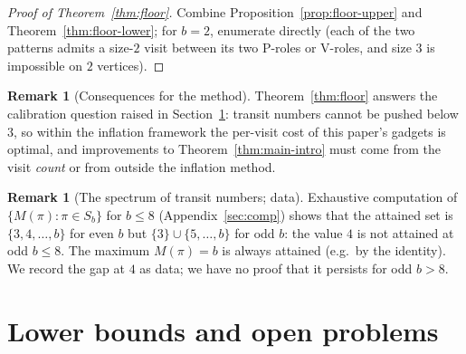 \documentclass[11pt]{article}
\theoremstyle{definition}
\newtheorem{remark}[theorem]{Remark}
\begin{document}
\begin{proof}[Proof of Theorem~\ref{thm:floor}]
Combine Proposition~\ref{prop:floor-upper} and Theorem~\ref{thm:floor-lower}; for
$b = 2$, enumerate directly (each of the two patterns admits a size-$2$ visit between
its two P-roles or V-roles, and size $3$ is impossible on $2$ vertices).
\end{proof}

\begin{remark}[Consequences for the method]\label{rem:floor-consequences}
Theorem~\ref{thm:floor} answers the calibration question raised in
Section~\ref{sec:disc}: transit numbers cannot be pushed below $3$, so within the
inflation framework the per-visit cost of this paper's gadgets is optimal, and
improvements to Theorem~\ref{thm:main-intro} must come from the visit \emph{count} or
from outside the inflation method.
\end{remark}

\begin{remark}[The spectrum of transit numbers; data]\label{rem:spectrum}
Exhaustive computation of $\{M(\pi) : \pi \in S_b\}$ for $b \le 8$
(Appendix~\ref{sec:comp}) shows that the attained set is $\{3, 4, \dots, b\}$ for even
$b$ but $\{3\} \cup \{5, \dots, b\}$ for odd $b$: the value $4$ is not attained at
odd $b \le 8$. The maximum $M(\pi) = b$ is always attained (e.g.\ by the identity). We
record the gap at $4$ as data; we have no proof that it persists for odd $b > 8$.
\end{remark}



\section{Lower bounds and open problems}\label{sec:disc}
\end{document}
